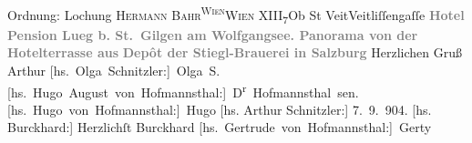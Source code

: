 \begin{ledgroupsized}[t]{13cm}
{\newline{}Ordnung: Lochung }\pstart{}{\pb}\textsc{Hermann Bahr}\pend{}\pstart{}\substVorne{}\textsuperscript{\textsc{Wien}}\substDazwischen{}\textsc{Wien XIII\textsubscript{7}}\substHinten{}{ }Ob St Veit\pend{}\pstart{}Veitliſſengaſſe\pend{}{\bigskip}\pstart
           \noindent{}\centering{}\textcolor{gray}{\textbf{{\pb}Hotel {\kaufmannsund} Pension
                        Lueg b. St. Gilgen am Wolfgangsee. Panorama von der Hotelterrasse
                     aus}}\pend
           \pstart
           \noindent{}\centering{}\textcolor{gray}{\textbf{Depôt der Stiegl-Brauerei
                     in Salzburg}}\pend
           \pstart
           Herzlichen Gruß \spacefill\mbox{Arthur}\pend
           \pstart
           \spacefill\mbox{{[}hs. Olga Schnitzler:{]} Olga S.}\pend
           \pstart
           \spacefill\mbox{{[}hs. Hugo August von Hofmannsthal:{]} D\textsuperscript{r}{ }Hofmannsthal sen.}\pend
           \pstart
           \spacefill\mbox{{[}hs. Hugo von Hofmannsthal:{]} Hugo}\pend
           \pstart
           {[}hs. Arthur Schnitzler:{]} 7. 9. 904.\pend
           \pstart
           {[}hs. Burckhard:{]} Herzlichſt \spacefill\mbox{Burckhard}\pend
           \pstart
           \spacefill\mbox{{[}hs. Gertrude von Hofmannsthal:{]} Gerty}\pend
           
         
         \endnumbering{}\end{ledgroupsized}  \newcommand{\dateiname}{L01438}\newcommand{\titel}{Arthur Schnitzler u. a. an Hermann Bahr, 7. 9. 1904}\newcommand{\editorInnen}{ Kurt Ifkovits,  Martin Anton Müller}
      